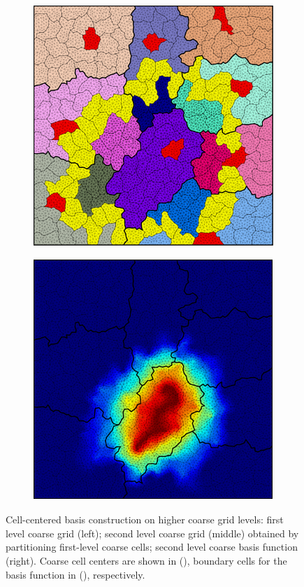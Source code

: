 \begin{figure}[htbp]
\begin{subfigure}[t]{0.3\textwidth}
  \end{subfigure}
  \hfill
  \begin{subfigure}[t]{0.3\textwidth}
    \centerline{\includegraphics[width=0.9\linewidth]{figs/square_tria_metis_cell_ml_lvl2_grid}}
  \end{subfigure}
  \hfill
  \begin{subfigure}[t]{0.3\textwidth}
    \centerline{\includegraphics[width=0.9\linewidth]{figs/square_tria_metis_cell_ml_lvl2_basis}}
  \end{subfigure}
  \caption[Higher level coarse grids and  cell-centered basis functions]{\label{fig:square_cell_ml} Cell-centered basis construction on higher coarse grid levels: first level coarse grid (left); second level coarse grid (middle) obtained by partitioning first-level coarse cells; second level coarse basis function (right).   Coarse cell centers are shown in (), boundary cells for the basis function in (), respectively.}
\end{figure}

